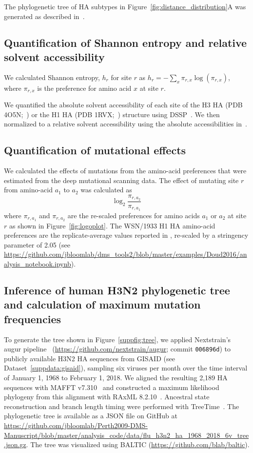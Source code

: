 \documentclass[9pt,twocolumn,twoside]{pnas-new}
\begin{document}
{The phylogenetic tree of HA subtypes in Figure~\ref{fig:distance_distribution}A was generated as described in~\cite{doud2018quantifying}.

\subsection*{Quantification of Shannon entropy and relative solvent accessibility}
We calculated Shannon entropy, $h_r$ for site $r$ as $h_r = - \sum_{x} \pi_{r,x} \log(\pi_{r,x})$, where $\pi_{r,x}$ is the preference for amino acid $x$ at site $r$.

We quantified the absolute solvent accessibility of each site of the H3 HA (PDB 4O5N;~\cite{lee2014receptor}) or the H1 HA (PDB 1RVX;~\cite{gamblin2004structure}) structure using DSSP~\cite{kabsch1983}.
We then normalized to a relative solvent accessibility using the absolute accessibilities in~\cite{tien2013}.

\subsection*{Quantification of mutational effects}
We calculated the effects of mutations from the amino-acid preferences that were estimated from the deep mutational scanning data.
The effect of mutating site $r$ from amino-acid $a_1$ to $a_2$ was calculated as
\begin{equation}
\log_2 \frac{\pi_{r,a_2}}{\pi_{r,a_1}}
\end{equation}
where $\pi_{r,a_1}$ and $\pi_{r,a_2}$ are the re-scaled preferences for amino acids $a_1$ or $a_2$ at site $r$ as shown in Figure~\ref{fig:logoplot}.
The WSN/1933 H1 HA amino-acid preferences are the replicate-average values reported in \cite{doud2016accurate}, re-scaled by a stringency parameter of 2.05 (see \url{https://github.com/jbloomlab/dms_tools2/blob/master/examples/Doud2016/analysis_notebook.ipynb}).

\subsection*{Inference of human H3N2 phylogenetic tree and calculation of maximum mutation frequencies}
To generate the tree shown in Figure~\ref{suppfig:tree}, we applied Nextstrain's augur pipeline~\cite{Hadfield224048} (\url{https://github.com/nextstrain/augur}; commit \texttt{006896d}) to publicly available H3N2 HA sequences from GISAID \cite{shu2017gisaid} (see Dataset~\ref{suppdata:gisaid}), sampling six viruses per month over the time interval of January 1, 1968 to February 1, 2018.
We aligned the resulting 2,189 HA sequences with MAFFT v7.310~\cite{katoh2013mafft} and constructed a maximum likelihood phylogeny from this alignment with RAxML 8.2.10~\cite{stamatakis2006raxml}.
Ancestral state reconstruction and branch length timing were performed with TreeTime~\cite{Sagulenko2018}.
The phylogenetic tree is available as a JSON file on GitHub at \url{https://github.com/jbloomlab/Perth2009-DMS-Manuscript/blob/master/analysis_code/data/flu_h3n2_ha_1968_2018_6v_tree.json.gz}.
The tree was visualized using BALTIC (\url{https://github.com/blab/baltic}).

}
\end{document}
